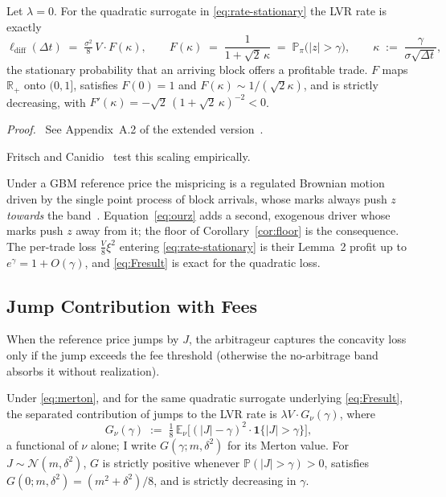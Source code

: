 \documentclass[runningheads]{llncs}
\newcommand{\E}{\mathbb{E}}
\newcommand{\Prob}{\mathbb{P}}
\newcommand{\R}{\mathbb{R}}
\newcommand{\dt}{\Delta t}
\newcommand{\1}{\mathbf{1}}
\newif\ifextended
\newcommand{\deferproof}[1]{%
  \par\smallskip\noindent\textit{Proof.}\ \ifextended
  See Appendix~#1.\else
  See Appendix~#1 of the extended version~\cite{bundi2026ext}.\fi\par\smallskip}
\begin{document}
\begin{lemma}\label{lem:F}
Let $\lambda=0$. For the quadratic surrogate in \eqref{eq:rate-stationary} the LVR rate is exactly
\begin{equation}\label{eq:Fresult}
\ell_{\mathrm{diff}}(\dt) \;=\; \tfrac{\sigma^2}{8}\,V \cdot F(\kappa),
\qquad
F(\kappa) \;=\; \frac{1}{1+\sqrt{2}\,\kappa} \;=\; \Prob_\pi\big(|z|>\gamma\big),
\qquad \kappa \;:=\; \frac{\gamma}{\sigma\sqrt{\dt}},
\end{equation}
the stationary probability that an arriving block offers a profitable trade. $F$ maps $\R_+$ onto $(0,1]$, satisfies $F(0)=1$ and $F(\kappa)\sim1/(\sqrt2\kappa)$, and is strictly decreasing, with $F'(\kappa) = -\sqrt2\,(1+\sqrt2\,\kappa)^{-2} < 0$.
\end{lemma}

\deferproof{A.2}

Fritsch and Canidio~\cite{fritsch2024measuring} test this scaling empirically.

\begin{remark}\label{rem:vsmmr}
Under a GBM reference price the mispricing is a regulated Brownian motion driven by the single point process of block arrivals, whose marks always push $z$ \emph{towards} the band~\cite[Eq.~(9)]{milionis2023automated}. Equation~\eqref{eq:ourz} adds a second, exogenous driver whose marks push $z$ away from it; the floor of Corollary~\ref{cor:floor} is the consequence. The per-trade loss $\tfrac{V}{8}\xi^2$ entering \eqref{eq:rate-stationary} is their Lemma~2 profit up to $e^{\gamma} = 1+O(\gamma)$, and \eqref{eq:Fresult} is exact for the quadratic loss.
\end{remark}

\subsection{Jump Contribution with Fees}

When the reference price jumps by $J$, the arbitrageur captures the concavity loss only if the jump exceeds the fee threshold (otherwise the no-arbitrage band absorbs it without realization).

\begin{lemma}\label{lem:G}
Under \eqref{eq:merton}, and for the same quadratic surrogate underlying \eqref{eq:Fresult}, the separated contribution of jumps to the LVR rate is $\lambda V \cdot G_\nu(\gamma)$, where
\begin{equation}\label{eq:G}
G_\nu(\gamma) \;:=\; \tfrac{1}{8}\,\E_\nu\!\Big[(|J| - \gamma)^2 \cdot \1\{|J| > \gamma\}\Big],
\end{equation}
a functional of $\nu$ alone; I write $G(\gamma;m,\delta^2)$ for its Merton value.
For $J \sim \mathcal{N}(m,\delta^2)$, $G$ is strictly positive whenever $\Prob(|J|>\gamma) > 0$, satisfies $G(0;m,\delta^2) = (m^2 + \delta^2)/8$, and is strictly decreasing in $\gamma$.
\end{lemma}
\end{document}
